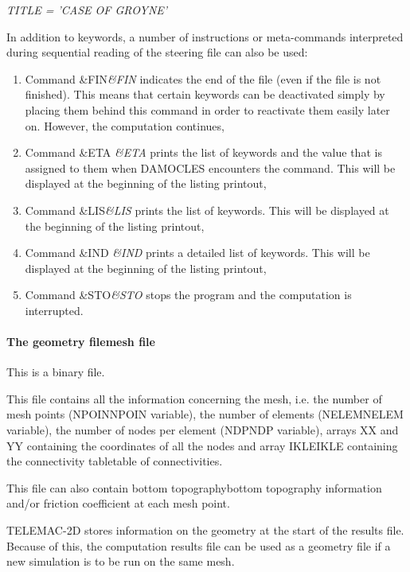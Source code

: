 \documentclass{article} %
\begin{document}
 \textit{TITLE = 'CASE OF GROYNE'}

 \textit{}

 \textit{}

 In addition to keywords, a number of instructions or meta-commands interpreted during sequential reading of the steering file can also be used:

\begin{enumerate}
\item  Command \&FIN\textit{\&FIN} indicates the end of the file (even if the file is not finished). This means that certain keywords can be deactivated simply by placing them behind this command in order to reactivate them easily later on. However, the computation continues,

\item  Command \&ETA \textit{\&ETA} prints the list of keywords and the value that is assigned to them when DAMOCLES encounters the command. This will be displayed at the beginning of the listing printout,

\item  Command  \&LIS\textit{\&LIS} prints the list of keywords. This will be displayed at the beginning of the listing printout,

\item  Command  \&IND  \textit{\&IND} prints a detailed list of keywords. This will be displayed at the beginning of the listing printout,

\item  Command \&STO\textit{\&STO} stops the program and the computation is interrupted.
\end{enumerate}


\paragraph{ The geometry filemesh file}

 This is a binary file.

 This file contains all the information concerning the mesh, i.e. the number of mesh points (NPOINNPOIN variable), the number of elements (NELEMNELEM variable), the number of nodes per element (NDPNDP variable), arrays XX and YY containing the coordinates of all the nodes and array IKLEIKLE containing the connectivity tabletable of connectivities.

 This file can also contain bottom topographybottom topography information and/or friction coefficient at each mesh point.

 TELEMAC-2D stores information on the geometry at the start of the results file. Because of this, the computation results file can be used as a geometry file if a new simulation is to be run on the same mesh.
\end{document}
